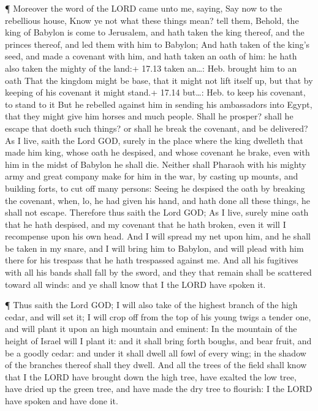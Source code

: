  ¶ Moreover the word of the LORD came unto me, saying,
 Say now to the rebellious house, Know ye not what these
things mean? tell them, Behold, the king of Babylon is come to
Jerusalem, and hath taken the king thereof, and the princes thereof, and
led them with him to Babylon;  And hath taken of the king's
seed, and made a covenant with him, and hath taken an oath of him: he
hath also taken the mighty of the land:+ 17.13 taken an\ldots: Heb.
brought him to an oath  That the kingdom might be base,
that it might not lift itself up, but that by keeping of his covenant it
might stand.+ 17.14 but\ldots: Heb. to keep his covenant, to stand to it
 But he rebelled against him in sending his ambassadors
into Egypt, that they might give him horses and much people. Shall he
prosper? shall he escape that doeth such things? or shall he break the
covenant, and be delivered?  As I live, saith the Lord GOD,
surely in the place where the king dwelleth that made him king, whose
oath he despised, and whose covenant he brake, even with him in the
midst of Babylon he shall die.  Neither shall Pharaoh with
his mighty army and great company make for him in the war, by casting up
mounts, and building forts, to cut off many persons: 
Seeing he despised the oath by breaking the covenant, when, lo, he had
given his hand, and hath done all these things, he shall not escape.
 Therefore thus saith the Lord GOD; As I live, surely mine
oath that he hath despised, and my covenant that he hath broken, even it
will I recompense upon his own head.  And I will spread my
net upon him, and he shall be taken in my snare, and I will bring him to
Babylon, and will plead with him there for his trespass that he hath
trespassed against me.  And all his fugitives with all his
bands shall fall by the sword, and they that remain shall be scattered
toward all winds: and ye shall know that I the LORD have spoken it.

 ¶ Thus saith the Lord GOD; I will also take of the highest
branch of the high cedar, and will set it; I will crop off from the top
of his young twigs a tender one, and will plant it upon an high mountain
and eminent:  In the mountain of the height of Israel will
I plant it: and it shall bring forth boughs, and bear fruit, and be a
goodly cedar: and under it shall dwell all fowl of every wing; in the
shadow of the branches thereof shall they dwell.  And all
the trees of the field shall know that I the LORD have brought down the
high tree, have exalted the low tree, have dried up the green tree, and
have made the dry tree to flourish: I the LORD have spoken and have done
it.

